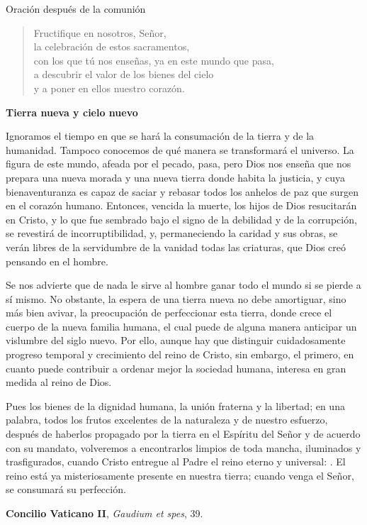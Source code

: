 \begin{liturgiabox}{Oración después de la comunión}
	\begin{quote}
		Fructifique en nosotros, Señor, \\la celebración de estos sacramentos, \\con los que tú nos enseñas, ya en este mundo que pasa, \\a descubrir el valor de los bienes del cielo \\y a poner en ellos nuestro corazón.	
	\end{quote}	
	
	\begin{liturgiatext}
		\textbf{Tierra nueva y cielo nuevo}
		
		Ignoramos el tiempo en que se hará la consumación de la tierra y de la humanidad. Tampoco conocemos de qué manera se transformará el universo. La figura de este mundo, afeada por el pecado, pasa, pero Dios nos enseña que nos prepara una nueva morada y una nueva tierra donde habita la justicia, y cuya bienaventuranza es capaz de saciar y rebasar todos los anhelos de paz que surgen en el corazón humano. Entonces, vencida la muerte, los hijos de Dios resucitarán en Cristo, y lo que fue sembrado bajo el signo de la debilidad y de la corrupción, se revestirá de incorruptibilidad, y, permaneciendo la caridad y sus obras, se verán libres de la servidumbre de la vanidad todas las criaturas, que Dios creó pensando en el hombre.
		
		Se nos advierte que de nada le sirve al hombre ganar todo el mundo si se pierde a sí mismo. No obstante, la espera de una tierra nueva no debe amortiguar, sino más bien avivar, la preocupación de perfeccionar esta tierra, donde crece el cuerpo de la nueva familia humana, el cual puede de alguna manera anticipar un vislumbre del siglo nuevo. Por ello, aunque hay que distinguir cuidadosamente progreso temporal y crecimiento del reino de Cristo, sin embargo, el primero, en cuanto puede contribuir a ordenar mejor la sociedad humana, interesa en gran medida al reino de Dios.
		
		Pues los bienes de la dignidad humana, la unión fraterna y la libertad; en una palabra, todos los frutos excelentes de la naturaleza y de nuestro esfuerzo, después de haberlos propagado por la tierra en el Espíritu del Señor y de acuerdo con su mandato, volveremos a encontrarlos limpios de toda mancha, iluminados y trasfigurados, cuando Cristo entregue al Padre el reino eterno y universal: . El reino está ya misteriosamente presente en nuestra tierra; cuando venga el Señor, se consumará su perfección.
		
		\textbf{Concilio Vaticano II}, \emph{Gaudium et spes}, 39.
	\end{liturgiatext}
	
\end{liturgiabox}

